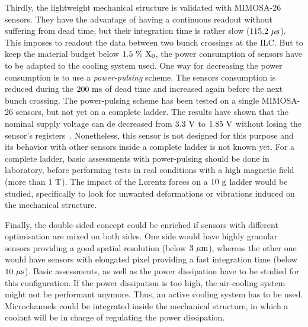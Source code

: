 Thirdly, the lightweight mechanical structure is validated with \gls{MIMOSA}-26 sensors.
They have the advantage of having a continuous readout without suffering from dead time, but their integration time is rather slow ($115.2~\rm{\mu s}$).
This imposes to readout the data between two bunch crossings at the \gls{ILC}.
But to keep the material budget below $1.5~\%~\rm{X_{0}}$, the power consumption of sensors have to be adapted to the cooling system used.
One way for decreasing the power consumption is to use a \textit{power-pulsing} scheme.
The sensors consumption is reduced during the $200~\rm{ms}$ of dead time and increased again before the next bunch crossing.
The power-pulsing scheme has been tested on a single \gls{MIMOSA}-26 sensors, but not yet on a complete ladder.
The results have shown that the nominal supply voltage can de decreased from $3.3~\rm{V}$ to $1.85~\rm{V}$ without losing the sensor's registers~\cite{Kuprash2013}.
Nonetheless, this sensor is not designed for this purpose and its behavior with other sensors inside a complete ladder is not known yet.
For a complete ladder, basic assessments with power-pulsing should be done in laboratory, before performing tests in real conditions with a high magnetic field (more than $1~\rm{T}$).
The impact of the Lorentz forces on a $10~\rm{g}$ ladder would be studied, specifically to look for unwanted deformations or vibrations induced on the mechanical structure.

Finally, the double-sided concept could be enriched if sensors with different optimisation are mixed on both sides.
One side would have highly granular sensors providing a good spatial resolution (below $3~\rm{\mu m}$), whereas the other one would have sensors with elongated pixel providing a fast integration time (below $10~\rm{\mu s}$).
Basic assessments, as well as the power dissipation have to be studied for this configuration.
If the power dissipation is too high, the air-cooling system might not be performant anymore.
Thus, an active cooling system has to be used.
Microchannels could be integrated inside the mechanical structure, in which a coolant will be in charge of regulating the power dissipation.


